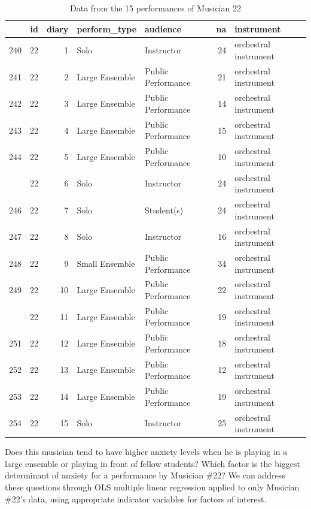 \documentclass[
]{krantz}
\begin{document}
\begin{table}[t]

\caption{\label{tab:table2chp8}Data from the 15 performances of Musician 22}
\centering
\begin{tabular}{lrrllrl}
\toprule
  & id & diary & perform\_type & audience & na & instrument\\
\midrule
240 & 22 & 1 & Solo & Instructor & 24 & orchestral instrument\\
241 & 22 & 2 & Large Ensemble & Public Performance & 21 & orchestral instrument\\
242 & 22 & 3 & Large Ensemble & Public Performance & 14 & orchestral instrument\\
243 & 22 & 4 & Large Ensemble & Public Performance & 15 & orchestral instrument\\
244 & 22 & 5 & Large Ensemble & Public Performance & 10 & orchestral instrument\\
\addlinespace
245 & 22 & 6 & Solo & Instructor & 24 & orchestral instrument\\
246 & 22 & 7 & Solo & Student(s) & 24 & orchestral instrument\\
247 & 22 & 8 & Solo & Instructor & 16 & orchestral instrument\\
248 & 22 & 9 & Small Ensemble & Public Performance & 34 & orchestral instrument\\
249 & 22 & 10 & Large Ensemble & Public Performance & 22 & orchestral instrument\\
\addlinespace
250 & 22 & 11 & Large Ensemble & Public Performance & 19 & orchestral instrument\\
251 & 22 & 12 & Large Ensemble & Public Performance & 18 & orchestral instrument\\
252 & 22 & 13 & Large Ensemble & Public Performance & 12 & orchestral instrument\\
253 & 22 & 14 & Large Ensemble & Public Performance & 19 & orchestral instrument\\
254 & 22 & 15 & Solo & Instructor & 25 & orchestral instrument\\
\bottomrule
\end{tabular}
\end{table}

Does this musician tend to have higher anxiety levels when he is playing in a large ensemble or playing in front of fellow students? Which factor is the biggest determinant of anxiety for a performance by Musician \#22? We can address these questions through OLS multiple linear regression applied to only Musician \#22's data, using appropriate indicator variables for factors of interest.
\end{document}
